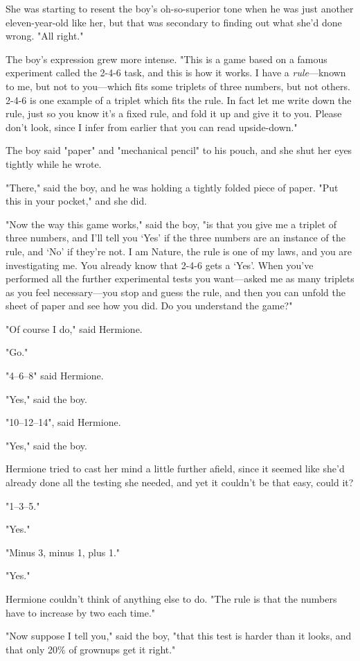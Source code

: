 She was starting to resent the boy's oh-so-superior tone when he was just
another eleven-year-old like her, but that was secondary to finding out what
she'd done wrong. "All right."

The boy's expression grew more intense. "This is a game based on a famous
experiment called the 2-4-6 task, and this is how it works. I have a
\emph{rule}—known to me, but not to you—which fits some triplets of three
numbers, but not others. 2-4-6 is one example of a triplet which fits the rule.
In fact{\el} let me write down the rule, just so you know it's a fixed rule,
and fold it up and give it to you. Please don't look, since I infer from
earlier that you can read upside-down."

The boy said "paper" and "mechanical pencil" to his pouch, and she shut her
eyes tightly while he wrote.

"There," said the boy, and he was holding a tightly folded piece of paper. "Put
this in your pocket," and she did.

"Now the way this game works," said the boy, "is that you give me a triplet of
three numbers, and I'll tell you `Yes' if the three numbers are an instance of
the rule, and `No' if they're not. I am Nature, the rule is one of my laws, and
you are investigating me. You already know that 2-4-6 gets a `Yes'. When you've
performed all the further experimental tests you want—asked me as many
triplets as you feel necessary—you stop and guess the rule, and then you can
unfold the sheet of paper and see how you did. Do you understand the game?"

"Of course I do," said Hermione.

"Go."

"4--6--8" said Hermione.

"Yes," said the boy.

"10--12--14", said Hermione.

"Yes," said the boy.

Hermione tried to cast her mind a little further afield, since it seemed like
she'd already done all the testing she needed, and yet it couldn't be that
easy, could it?

"1--3--5."

"Yes."

"Minus 3, minus 1, plus 1."

"Yes."

Hermione couldn't think of anything else to do. "The rule is that the numbers
have to increase by two each time."

"Now suppose I tell you," said the boy, "that this test is harder than it
looks, and that only 20\% of grownups get it right."

